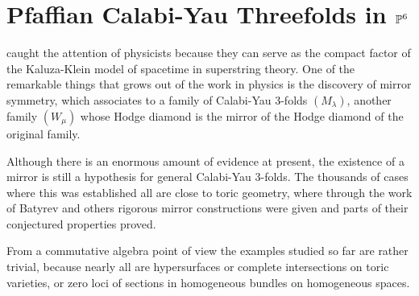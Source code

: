 







\section{Pfaffian Calabi-Yau Threefolds in ${\mathbb P}^6$}

 caught the attention of physicists
because they can serve as the compact factor of the
Kaluza-Klein model of spacetime
in superstring theory.
One of the remarkable things that grows out of the work in physics
is the discovery of mirror symmetry, which associates to a family of
Calabi-Yau 3-folds $(M_\lambda)$, another family $(W_\mu)$ whose Hodge
diamond is the mirror of the Hodge diamond of the original family.

Although there is an enormous amount of evidence at present, the existence 
of a mirror is still a hypothesis for general Calabi-Yau 3-folds. 
The thousands of cases where this was established all are close to toric
geometry, where through the work of Batyrev and others \cite{CO:Ba,CO:CK} 
rigorous mirror
constructions were given and parts of their conjectured properties proved.


\medskip
From a commutative algebra point of view the examples studied so far are 
rather trivial, because nearly all are hypersurfaces or complete 
intersections on toric varieties, or zero loci of sections in 
homogeneous bundles on homogeneous spaces.  

